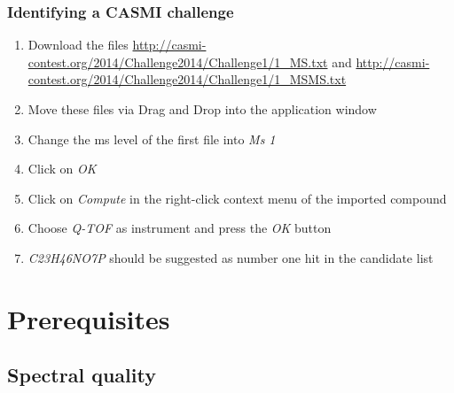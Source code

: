 \documentclass[letterpaper,10pt,openany,oneside]{sphinxmanual}
\newcommand\gui[1]{\textsl{\guilsinglleft#1\guilsinglright\xspace}}
\begin{document}
\subsection{Identifying a CASMI challenge}
\label{gui:identifying-a-casmi-challenge}\begin{enumerate}
\item {} 
Download the files \url{http://casmi-contest.org/2014/Challenge2014/Challenge1/1\_MS.txt} and \url{http://casmi-contest.org/2014/Challenge2014/Challenge1/1\_MSMS.txt}

\item {} 
Move these files via Drag and Drop into the application window

\item {} 
Change the ms level of the first file into \gui{Ms 1}

\item {} 
Click on \gui{OK}

\item {} 
Click on \gui{Compute} in the right-click context menu of the imported compound

\item {} 
Choose \gui{Q-TOF} as instrument and press the \gui{OK} button

\item {} 
\emph{C23H46NO7P} should be suggested as number one hit in the candidate list

\end{enumerate}
  

\chapter{Prerequisites}\label{gui::prerequisites}

\section{Spectral quality}
\end{document}
